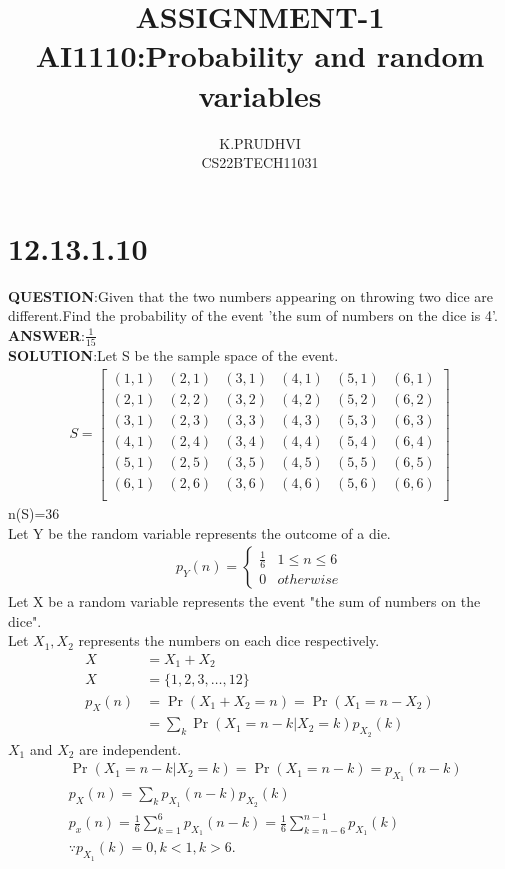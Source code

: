 \documentclass[journal,12pt,twocolumn]{IEEEtran}
\title{ASSIGNMENT-1\\AI1110:Probability and random variables}
\author{K.PRUDHVI\\CS22BTECH11031}
\providecommand{\pr}[1]{\ensuremath{\Pr\left(#1\right)}}
\theoremstyle{remark}
\begin{document}
\maketitle
\section*{\textbf{12.13.1.10}}
\textbf{QUESTION}:Given that the two numbers appearing on throwing two dice are different.Find the probability of the event 'the sum of numbers on the dice is 4'.\\
\textbf{ANSWER}:$\frac{1}{15}$\\[3pt]
\textbf{SOLUTION}:Let S be the sample space of the event.
\begin{align}
S=
\begin{bmatrix}
(1,1) & (2,1) & (3,1) & (4,1) & (5,1) & (6,1) \\
(2,1) & (2,2) & (3,2) & (4,2) & (5,2) & (6,2) \\
(3,1) & (2,3) & (3,3) & (4,3) & (5,3) & (6,3) \\
(4,1) & (2,4) & (3,4) & (4,4) & (5,4) & (6,4) \\
(5,1) & (2,5) & (3,5) & (4,5) & (5,5) & (6,5) \\
(6,1) & (2,6) & (3,6) & (4,6) & (5,6) & (6,6) \\
\end{bmatrix}
\end{align}
n(S)=36\\
Let Y be the random variable represents the outcome of a die.\\
\begin{align}
  p_Y(n)=
  \begin{cases}
    \frac{1}{6} & 1 \leq n \leq 6 \\
    0 & otherwise
  \end{cases}
  \label{2}
  \end{align}
Let X be a random variable represents the event "the sum of numbers on the dice".\\
Let $X_1,X_2$ represents the numbers on each dice respectively.
\begin{align}
X&=X_1+X_2\\
X&=\{1,2,3,\dots,12\}\\
p_X(n)&=\pr{X_1+X_2=n}=\pr{X_1=n-X_2}\\
      &=\sum_{k}\pr{X_1=n-k|X_2=k}p_{X_2}(k)
\end{align}
$X_1$ and $X_2$ are independent.
\begin{align}
  &\pr{X_1=n-k|X_2=k}=\pr{X_1=n-k}=p_{X_1}(n-k)\\
  &p_X(n)=\sum_k{p_{X_1}(n-k)p_{X_2}(k)}\\
  &p_x(n)=\frac{1}{6}\sum_{k=1}^{6}p_{X_1}(n-k)=\frac{1}{6}\sum_{k=n-6}^{n-1}p_{X_1}(k) \label{9}\\
  &\because p_{X_1}(k)=0, k<1,k>6.
\end{align}
\end{document}
